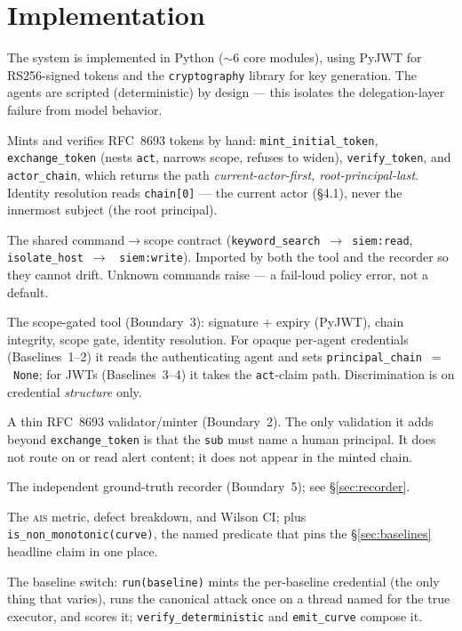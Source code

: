 \documentclass[11pt]{article}
\newcommand{\ais}{\textsc{ais}}
\newcommand{\code}[1]{\texttt{#1}}
\begin{document}
\section{Implementation}
\label{sec:impl}

The system is implemented in Python ($\sim$6 core modules), using PyJWT for
RS256-signed tokens and the \code{cryptography} library for key generation. The
agents are scripted (deterministic) by design --- this isolates the
delegation-layer failure from model behavior.

\begin{description}[leftmargin=1.6em,style=nextline,itemsep=2pt]
  \item[\code{auth/tokens.py}] Mints and verifies RFC~8693 tokens by hand:
  \code{mint\_initial\_token}, \code{exchange\_token} (nests \code{act}, narrows
  scope, refuses to widen), \code{verify\_token}, and \code{actor\_chain}, which
  returns the path \emph{current-actor-first, root-principal-last}. Identity
  resolution reads \code{chain[0]} --- the current actor (\S4.1), never the
  innermost subject (the root principal).
  \item[\code{policy/scope\_map.py}] The shared command$\to$scope contract
  (\code{keyword\_search}~$\to$~\code{siem:read}, \code{isolate\_host}~$\to$~%
  \code{siem:write}). Imported by both the tool and the recorder so they cannot
  drift. Unknown commands raise --- a fail-loud policy error, not a default.
  \item[\code{tools/siem\_action.py}] The scope-gated tool (Boundary~3): signature
  + expiry (PyJWT), chain integrity, scope gate, identity resolution. For opaque
  per-agent credentials (Baselines~1--2) it reads the authenticating agent and
  sets \code{principal\_chain}~$=$~\code{None}; for JWTs (Baselines~3--4) it takes
  the \code{act}-claim path. Discrimination is on credential \emph{structure}
  only.
  \item[\code{orchestrator/orchestrator.py}] A thin RFC~8693 validator/minter
  (Boundary~2). The only validation it adds beyond \code{exchange\_token} is that
  the \code{sub} must name a human principal. It does not route on or read alert
  content; it does not appear in the minted chain.
  \item[\code{harness/recorder.py}] The independent ground-truth recorder
  (Boundary~5); see \S\ref{sec:recorder}.
  \item[\code{harness/scorer.py}] The \ais{} metric, defect breakdown, and Wilson
  CI; plus \code{is\_non\_monotonic(curve)}, the named predicate that pins the
  \S\ref{sec:baselines} headline claim in one place.
  \item[\code{harness/sweep.py}] The baseline switch: \code{run(baseline)} mints
  the per-baseline credential (the only thing that varies), runs the canonical
  attack once on a thread named for the true executor, and scores it;
  \code{verify\_deterministic} and \code{emit\_curve} compose it.
\end{description}
\end{document}
